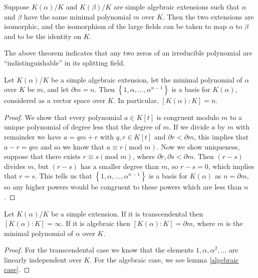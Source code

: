 \begin{corollary} \label{thm:minimal-polynomial-roots-isomorphic}
    Suppose $K(\alpha) / K$ and $K(\beta) / K$ are simple algebraic extensions such that $\alpha$ and $\beta$ have the same minimal polynomial $m$ over $K$. Then the two extensions are isomorphic, and the isomorphism of the large fields can be taken to map $\alpha$ to $\beta$ and to be the identity on $K$.
\end{corollary}

The above theorem indicates that any two zeros of an irreducible polynomial are ``indistinguishable'' in its splitting field.

\begin{lemma} \label{thm:degree-theorem}
    Let $K(\alpha) / K$ be a simple algebraic extension, let the minimal polynomial of $\alpha$ over $K$ be $m$, and let $\partial m=n$. Then $\left\{1, \alpha, \ldots, \alpha^{n-1}\right\}$ is a basis for $K(\alpha)$, considered as a vector space over $K$. In particular, \([K(\alpha):K]=n\). \label{algebraic case}
\end{lemma}

\begin{proof}
    We show that every polynomial \(a \in K[t]\) is congruent modulo \(m\) to a unique polynomial of degree less that the degree of \(m\). If we divide \(a\) by \(m\) with remainder we have \(a = qm + r\) with \(q,r \in K[t]\) and \(\partial r < \partial m\), this implies that \(a - r =qm\) and so we know that \(a \equiv r (\text{mod } m)\). Now we show uniqueness, suppose that there exists \(r \equiv s(\text{mod }m)\), where \(\partial r, \partial s < \partial m\). Then \((r - s)\) divides \(m\), but \((r-s)\) has a smaller degree than \(m\), so \(r-s=0\), which implies that \(r=s\). This tells us that $\left\{1, \alpha, \ldots, \alpha^{n-1}\right\}$ is a basis for \(K(\alpha)\) as \(n = \partial m\), so any higher powers would be congruent to these powers which are less than \(n\).
    \end{proof}

\begin{theorem}
    Let $K(\alpha) / K$ be a simple extension. If it is transcendental then $[K(\alpha): K]=\infty$. If it is algebraic then $[K(\alpha): K]=\partial m$, where $m$ is the minimal polynomial of $\alpha$ over $K$. \label{finite degree theorem}
\end{theorem}

\begin{proof}
For the transcendental case we know that the elements $1, \alpha, \alpha^2, \ldots$ are linearly independent over $K$. For the algebraic case, we see lemma \ref{algebraic case}.
\end{proof}

